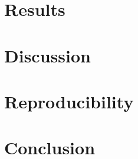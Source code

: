 \documentclass[sigconf,review,anonymous]{acmart}
\begin{document}
\section{Results}


\section{Discussion}


\section{Reproducibility}


\section{Conclusion}




\end{document}
